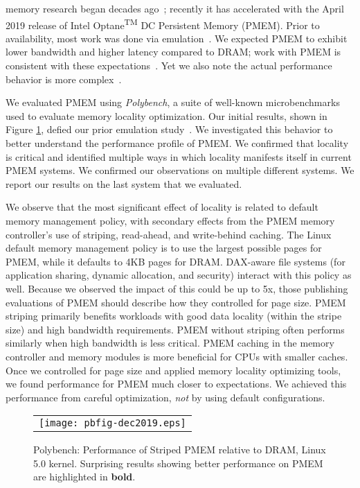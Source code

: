  memory research began decades ago~\cite{wu1994envy}; recently it has accelerated with the April 2019 release of Intel Optane\textsuperscript{\tiny TM} DC Persistent Memory (PMEM). Prior to availability, most work was done via emulation~\cite{wu1994envy,Maciejewski2017persistent,dulloor2014system,volos2015quartz,doudali2017comerge}.  We expected PMEM to exhibit lower bandwidth and higher latency compared to DRAM; work with PMEM is consistent with these expectations~\cite{gill2019single,izraelevitz2019basic}.  Yet we also note the actual performance behavior is more complex~\cite{peng2019system}. 

We evaluated PMEM using \textit{Polybench}, a suite of well-known microbenchmarks used to evaluate memory locality optimization.  Our initial results, shown in Figure \ref{fig:polybench}, defied our prior emulation study~\cite{doudali2017comerge}.  We investigated this behavior to better understand the performance profile of PMEM. We confirmed that locality is critical and identified multiple ways in which locality manifests itself in current PMEM systems.  We confirmed our observations on multiple different systems.  We report our results on the last system that we evaluated.

We observe that the most significant effect of locality is related to default memory management policy, with secondary effects from the PMEM memory controller's use of striping, read-ahead, and write-behind caching.  The Linux default memory management policy is to use the largest possible pages for PMEM, while it defaults to 4KB pages for DRAM.  DAX-aware file systems (for application sharing, dynamic allocation, and security) interact with this policy as well.  Because we observed the impact of this could be up to 5x, those publishing evaluations of PMEM should describe how they controlled for page size. PMEM striping primarily benefits workloads with good data locality (within the stripe size) and high bandwidth requirements.  PMEM without striping often performs similarly when high bandwidth is less critical.  PMEM caching in the memory controller and memory modules is more beneficial for CPUs with smaller caches.  Once we controlled for page size and applied memory locality optimizing tools, we found performance for PMEM much closer to expectations.  We achieved this performance from careful optimization, \textit{not} by using default configurations.

\begin{figure}[!htb]
    \captionsetup{justification=centering}
    \centering
    \caption{Polybench: Performance of Striped PMEM relative to DRAM, Linux 5.0 kernel.  Surprising results showing better performance on PMEM are highlighted in \textbf{bold}.}
    \vspace{0.1cm}
    \label{fig:polybench}
    \begin{tabular}{c}
        \texttt{[image: pbfig-dec2019.eps]}
    \end{tabular}
\end{figure}

